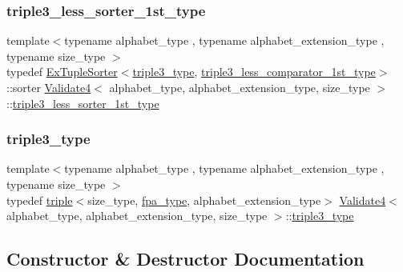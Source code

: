 \subsubsection{\texorpdfstring{triple3\+\_\+less\+\_\+sorter\+\_\+1st\+\_\+type}{triple3\_less\_sorter\_1st\_type}}
{\footnotesize\ttfamily template$<$typename alphabet\+\_\+type , typename alphabet\+\_\+extension\+\_\+type , typename size\+\_\+type $>$ \\
typedef \hyperlink{struct_ex_tuple_sorter}{Ex\+Tuple\+Sorter}$<$\hyperlink{class_validate4_a2bc9345c182543a419af47b6c8bd37d2}{triple3\+\_\+type}, \hyperlink{class_validate4_a473516f742b15338b55ec169c794f7ca}{triple3\+\_\+less\+\_\+comparator\+\_\+1st\+\_\+type}$>$\+::sorter \hyperlink{class_validate4}{Validate4}$<$ alphabet\+\_\+type, alphabet\+\_\+extension\+\_\+type, size\+\_\+type $>$\+::\hyperlink{class_validate4_ac2e4bde5df51eeff18ef5591d76e63dc}{triple3\+\_\+less\+\_\+sorter\+\_\+1st\+\_\+type}\hspace{0.3cm}{\ttfamily [private]}}

\mbox{\label{class_validate4_a2bc9345c182543a419af47b6c8bd37d2}} 
\subsubsection{\texorpdfstring{triple3\+\_\+type}{triple3\_type}}
{\footnotesize\ttfamily template$<$typename alphabet\+\_\+type , typename alphabet\+\_\+extension\+\_\+type , typename size\+\_\+type $>$ \\
typedef \hyperlink{structtriple}{triple}$<$size\+\_\+type, \hyperlink{common_8h_a7fdaf8b9b3d2f6ae6b10597a8d3f96ee}{fpa\+\_\+type}, alphabet\+\_\+extension\+\_\+type$>$ \hyperlink{class_validate4}{Validate4}$<$ alphabet\+\_\+type, alphabet\+\_\+extension\+\_\+type, size\+\_\+type $>$\+::\hyperlink{class_validate4_a2bc9345c182543a419af47b6c8bd37d2}{triple3\+\_\+type}\hspace{0.3cm}{\ttfamily [private]}}



\subsection{Constructor \& Destructor Documentation}
\mbox{\label{class_validate4_aa1e9bf045b028c339da30db955857cb9}} 
